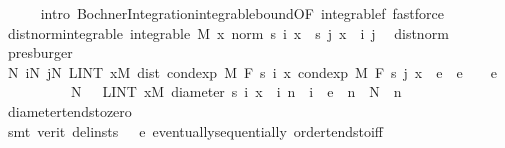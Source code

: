 \begin{isabellebody}
\ \ \ \ \isamarkupfalse%
\ {\isacharparenleft}{\kern0pt}intro\ Bochner{\isacharunderscore}{\kern0pt}Integration{\isachardot}{\kern0pt}integrable{\isacharunderscore}{\kern0pt}bound{\isacharbrackleft}{\kern0pt}OF\ integrable{\isacharunderscore}{\kern0pt}{}f{\isacharbrackright}{\kern0pt}{\isacharparenright}{\kern0pt}\ fastforce{\isacharplus}{\kern0pt}\isanewline
\ \ \ \isanewline
\ \ \isamarkupfalse%
\ dist{\isacharunderscore}{\kern0pt}norm{\isacharunderscore}{\kern0pt}integrable{\isacharcolon}{\kern0pt}\ {\isachardoublequoteopen}integrable\ M\ {\isacharparenleft}{\kern0pt}{\isasymlambda}x{\isachardot}{\kern0pt}\ norm\ {\isacharparenleft}{\kern0pt}s\ i\ x\ {\isacharminus}{\kern0pt}\ s\ j\ x{\isacharparenright}{\kern0pt}{\isacharparenright}{\kern0pt}{\isachardoublequoteclose}\ \ i\ j\ \isamarkupfalse%
\ dist{\isacharunderscore}{\kern0pt}norm\ \isamarkupfalse%
\ presburger\isanewline
\isanewline
\ \ \isamarkupfalse%
\ {\isachardoublequoteopen}{\isasymexists}N{\isachardot}{\kern0pt}\ {\isasymforall}i{\isasymge}N{\isachardot}{\kern0pt}\ {\isasymforall}j{\isasymge}N{\isachardot}{\kern0pt}\ LINT\ x{\isacharbar}{\kern0pt}M{\isachardot}{\kern0pt}\ dist\ {\isacharparenleft}{\kern0pt}cond{\isacharunderscore}{\kern0pt}exp\ M\ F\ {\isacharparenleft}{\kern0pt}s\ i{\isacharparenright}{\kern0pt}\ x{\isacharparenright}{\kern0pt}\ {\isacharparenleft}{\kern0pt}cond{\isacharunderscore}{\kern0pt}exp\ M\ F\ {\isacharparenleft}{\kern0pt}s\ j{\isacharparenright}{\kern0pt}\ x{\isacharparenright}{\kern0pt}\ {\isacharless}{\kern0pt}\ e{\isachardoublequoteclose}\ \ {\isachardoublequoteopen}e\ {\isachargreater}{\kern0pt}\ {}{\isachardoublequoteclose}\ \ e\isanewline
\ \ \isamarkupfalse%
\ {\isacharminus}{\kern0pt}\isanewline
\ \ \ \ \isamarkupfalse%
\ N\ \ {\isacharasterisk}{\kern0pt}{\isacharcolon}{\kern0pt}\ {\isachardoublequoteopen}LINT\ x{\isacharbar}{\kern0pt}M{\isachardot}{\kern0pt}\ diameter\ {\isacharbraceleft}{\kern0pt}s\ i\ x\ {\isacharbar}{\kern0pt}\ i{\isachardot}{\kern0pt}\ n\ {\isasymle}\ i{\isacharbraceright}{\kern0pt}\ {\isacharless}{\kern0pt}\ e{\isachardoublequoteclose}\ \ {\isachardoublequoteopen}n\ {\isasymge}\ N{\isachardoublequoteclose}\ \ n\ \isamarkupfalse%
\ diameter{\isacharunderscore}{\kern0pt}tendsto{\isacharunderscore}{\kern0pt}zero\ \isamarkupfalse%
\ {\isacharparenleft}{\kern0pt}smt\ {\isacharparenleft}{\kern0pt}verit{\isacharcomma}{\kern0pt}\ del{\isacharunderscore}{\kern0pt}insts{\isacharparenright}{\kern0pt}\ {\isacartoucheopen}{}\ {\isacharless}{\kern0pt}\ e{\isacartoucheclose}\ eventually{\isacharunderscore}{\kern0pt}sequentially\ order{\isacharunderscore}{\kern0pt}tendsto{\isacharunderscore}{\kern0pt}iff{\isacharparenright}{\kern0pt}\isanewline

\end{isabellebody}
